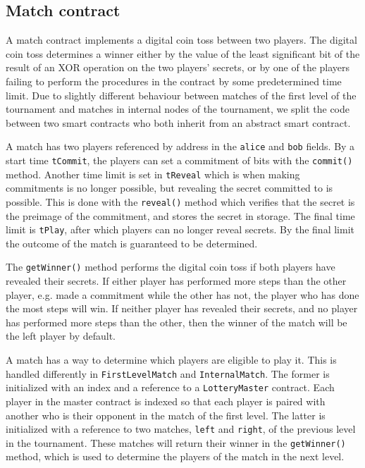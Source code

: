 

\subsection{Match contract}
A match contract implements a digital coin toss between two players. The digital coin toss determines a winner either by the value of the least significant bit of the result of an XOR operation on the two players' secrets, or by one of the players failing to perform the procedures in the contract by some predetermined time limit.
Due to slightly different behaviour between matches of the first level of the tournament and matches in internal nodes of the tournament, we split the code between two smart contracts who both inherit from an abstract smart contract.

A match has two players referenced by address in the \texttt{alice} and \texttt{bob} fields. By a start time \texttt{tCommit}, the players can set a commitment of bits with the \texttt{commit()} method. Another time limit is set in \texttt{tReveal} which is when making commitments is no longer possible, but revealing the secret committed to is possible. This is done with the \texttt{reveal()} method which verifies that the secret is the preimage of the commitment, and stores the secret in storage. The final time limit is \texttt{tPlay}, after which players can no longer reveal secrets. By the final limit the outcome of the match is guaranteed to be determined. 

The \texttt{getWinner()} method performs the digital coin toss if both players have revealed their secrets. If either player has performed more steps than the other player, e.g. made a commitment while the other has not, the player who has done the most steps will win. If neither player has revealed their secrets, and no player has performed more steps than the other, then the winner of the match will be the left player by default.

A match has a way to determine which players are eligible to play it. This is handled differently in \texttt{FirstLevelMatch} and \texttt{InternalMatch}. The former is initialized with an index and a reference to a \texttt{LotteryMaster} contract. Each player in the master contract is indexed so that each player is paired with another who is their opponent in the match of the first level. The latter is initialized with a reference to two matches, \texttt{left} and \texttt{right}, of the previous level in the tournament. These matches will return their winner in the \texttt{getWinner()} method, which is used to determine the players of the match in the next level. 

